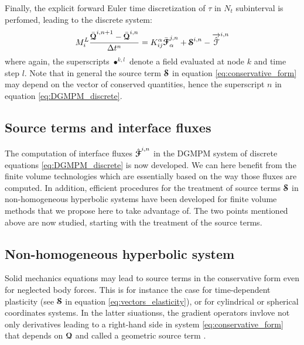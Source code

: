 

Finally, the explicit forward Euler time discretization of $\tau$ in $N_t$ subinterval is perfomed, leading to the discrete system:
\begin{equation}
  \label{eq:DGMPM_discrete}
  M^L_i \frac{\bar{{\boldsymbol{\mathcal{Q}}}}^{i,n+1} - \bar{{\boldsymbol{\mathcal{Q}}}}^{i,n}}{\Delta t^{n} } = K^\alpha_{ij} \bar{{\boldsymbol{\mathcal{F}}}}_{\alpha}^{j,n} + {\boldsymbol{\mathcal{S}}}^{i,n}- {\overrightarrow{\hat{\mathcal{F}}}}^{i,n}  
\end{equation}
where again, the superscripts $\bullet^{k,l}$ denote a field evaluated at node $k$ and time step $l$.
Note that in general the source term ${\boldsymbol{\mathcal{S}}}$ in equation \eqref{eq:conservative_form} may depend on the vector of conserved quantities, hence the superscript $n$ in equation \eqref{eq:DGMPM_discrete}. 

\subsection{Source terms and interface fluxes}
The computation of interface fluxes $\hat{{\boldsymbol{\mathcal{F}}}}^{i,n}$ in the DGMPM system of discrete equations \eqref{eq:DGMPM_discrete} is now developed. We can here benefit from the finite volume technologies which are essentially based on the way those fluxes are computed. In addition, efficient procedures for the treatment of source terms ${\boldsymbol{\mathcal{S}}}$ in non-homogeneous hyperbolic systems have been developed for finite volume methods that we propose here to take advantage of. The two points mentioned above are now studied, starting with the treatment of the source terms.

\subsection{Non-homogeneous hyperbolic system}
Solid mechanics equations may lead to source terms in the conservative form even for neglected body forces. This is for instance the case for time-dependent plasticity (see ${\boldsymbol{\mathcal{S}}}$ in equation \eqref{eq:vectors_elasticity}), or for cylindrical or spherical coordinates systems. In the latter siuationss, the gradient operators invlove not only derivatives leading to a right-hand side in system \eqref{eq:conservative_form} that depends on ${\boldsymbol{\mathcal{Q}}}$ and called a geometric source term \cite[Ch.~17]{Leveque}. 

